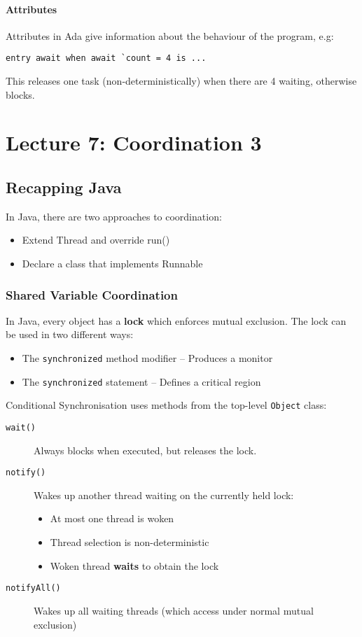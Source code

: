 \documentclass{article}
\begin{document}
\paragraph{Attributes}
\label{sec:orgea96a9c}
Attributes in Ada give information about the behaviour of the program, e.g:
\begin{verbatim}
entry await when await `count = 4 is ...
\end{verbatim}
This releases one task (non-deterministically) when there are 4 waiting, otherwise blocks.

\maketitle
\section{Lecture 7: Coordination 3}


\subsection{Recapping Java}
\label{sec:org20921fc}
In Java, there are two approaches to coordination:
\begin{itemize}
\item Extend Thread and override run()
\item Declare a class that implements Runnable
\end{itemize}

\subsubsection{Shared Variable Coordination}
\label{sec:org78ecc99}
In Java, every object has a \textbf{lock} which enforces mutual exclusion.
The lock can be used in two different ways:
\begin{itemize}
\item The \texttt{synchronized} method modifier -- Produces a monitor
\item The \texttt{synchronized} statement -- Defines a critical region
\end{itemize}

Conditional Synchronisation uses methods from the top-level \texttt{Object} class:
\begin{description}
\item[{\texttt{wait()}}] Always blocks when executed, but releases the lock.
\item[{\texttt{notify()}}] Wakes up another thread waiting on the currently held lock:
\begin{itemize}
\item At most one thread is woken
\item Thread selection is non-deterministic
\item Woken thread \textbf{waits} to obtain the lock
\end{itemize}
\item[{\texttt{notifyAll()}}] Wakes up all waiting threads (which access under normal mutual exclusion)
\end{description}
\end{document}
